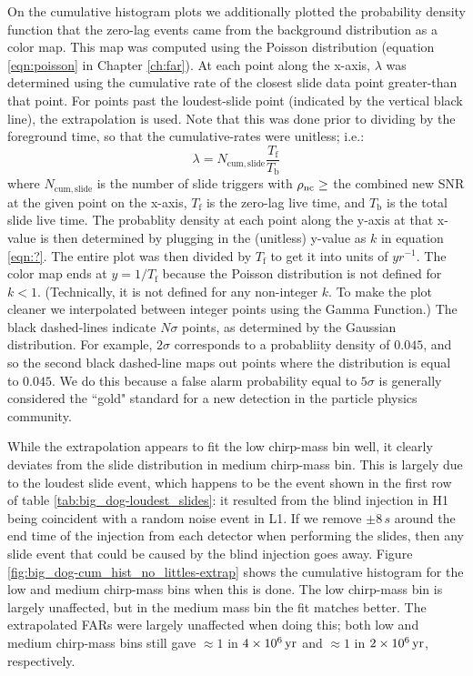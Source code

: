 On the cumulative histogram plots we additionally plotted the probability density function that the zero-lag events came from the background distribution as a color map. This map was computed using the Poisson distribution (equation \ref{eqn:poisson} in Chapter \ref{ch:far}). At each point along the x-axis, $\lambda$ was determined using the cumulative rate of the closest slide data point greater-than that point. For points past the loudest-slide point (indicated by the vertical black line), the extrapolation is used. Note that this was done prior to dividing by the foreground time, so that the cumulative-rates were unitless; i.e.:
\begin{equation*}
\lambda = N_{\mathrm{cum,slide}} \frac{T_{\mathrm{f}}}{T_{\mathrm{b}}}
\end{equation*}
where $N_{\mathrm{cum,slide}}$ is the number of slide triggers with $\rho_{\mathrm{nc}} \geq$ the combined new \ac{SNR} at the given point on the x-axis, $T_{\mathrm{f}}$ is the zero-lag live time, and $T_{\mathrm{b}}$ is the total slide live time. The probablity density at each point along the y-axis at that x-value is then determined by plugging in the (unitless) y-value as $k$ in equation \ref{eqn:?}. The entire plot was then divided by $T_{\mathrm{f}}$ to get it into units of $yr^{-1}$. The color map ends at $y = 1 / T_{\mathrm{f}}$ because the Poisson distribution is not defined for $k < 1$. (Technically, it is not defined for any non-integer $k$. To make the plot cleaner we interpolated between integer points using the Gamma Function.) The black dashed-lines indicate $N\sigma$ points, as determined by the Gaussian distribution. For example, $2\sigma$ corresponds to a probabliity density of $0.045$, and so the second black dashed-line maps out points where the distribution is equal to $0.045$. We do this because a false alarm probability equal to $5\sigma$ is generally considered the ``gold" standard for a new detection in the particle physics community.

While the extrapolation appears to fit the low chirp-mass bin well, it clearly deviates from the slide distribution in medium chirp-mass bin. This is largely due to the loudest slide event, which happens to be the event shown in the first row of table \ref{tab:big_dog-loudest_slides}: it resulted from the blind injection in H1 being coincident with a random noise event in L1. If we remove $\pm8\,s$ around the end time of the injection from each detector when performing the slides, then any slide event that could be caused by the blind injection goes away. Figure \ref{fig:big_dog-cum_hist_no_littles-extrap} shows the cumulative histogram for the low and medium chirp-mass bins when this is done. The low chirp-mass bin is largely unaffected, but in the medium mass bin the fit matches better. The extrapolated \acp{FAR} were largely unaffected when doing this; both low and medium chirp-mass bins still gave $\approx 1$ in $4\times 10^{6}\,\mathrm{yr}$ and $\approx 1$ in $2\times 10^{6}\,\mathrm{yr}$, respectively.

